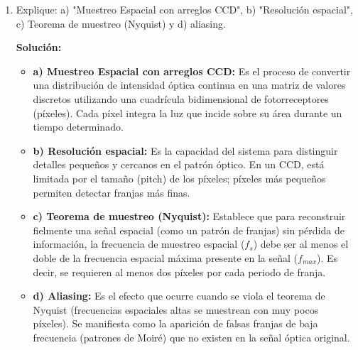 \documentclass[12pt, letterpaper]{article}
\begin{document}
\begin{enumerate}
		\textbf{Solución:}
		\begin{itemize}
			\item Sabiendo que la ecuación de interferencia es $I = I_1 + I_2 + 2\sqrt{I_1 I_2}\cos(\Delta\phi)$, los valores máximos y mínimos ocurren cuando el coseno es $1$ y $-1$, respectivamente:
			$$ I_{max} = I_1 + I_2 + 2\sqrt{I_1 I_2} $$
			$$ I_{min} = I_1 + I_2 - 2\sqrt{I_1 I_2} $$
			Sustituyendo en $\gamma$:
			$$ \gamma = \frac{(I_1 + I_2 + 2\sqrt{I_1 I_2}) - (I_1 + I_2 - 2\sqrt{I_1 I_2})}{(I_1 + I_2 + 2\sqrt{I_1 I_2}) + (I_1 + I_2 - 2\sqrt{I_1 I_2})} $$
			$$ \gamma = \frac{4\sqrt{I_1 I_2}}{2(I_1 + I_2)} = \frac{2\sqrt{I_1 I_2}}{I_1 + I_2} $$
			
			\item Cuando las intensidades son iguales ($I_1 = I_2 = I_0$):
			$$ \gamma = \frac{2\sqrt{I_0 I_0}}{I_0 + I_0} = \frac{2I_0}{2I_0} = 1 $$
			
			\item La visibilidad (o contraste) es una medida cuantitativa de la claridad de las franjas de interferencia. Su utilidad radica en que permite evaluar el grado de coherencia de la fuente de luz, el balance de intensidades en los brazos del interferómetro y la influencia de vibraciones o ruido en el sistema óptico.
		\end{itemize}
		
		\item Explique: a) "Muestreo Espacial con arreglos CCD", b) "Resolución espacial", c) Teorema de muestreo (Nyquist) y d) aliasing. 
		
		\textbf{Solución:}
		\begin{itemize}
			\item \textbf{a) Muestreo Espacial con arreglos CCD:} Es el proceso de convertir una distribución de intensidad óptica continua en una matriz de valores discretos utilizando una cuadrícula bidimensional de fotorreceptores (píxeles). Cada píxel integra la luz que incide sobre su área durante un tiempo determinado.
			\item \textbf{b) Resolución espacial:} Es la capacidad del sistema para distinguir detalles pequeños y cercanos en el patrón óptico. En un CCD, está limitada por el tamaño (pitch) de los píxeles; píxeles más pequeños permiten detectar franjas más finas.
			\item \textbf{c) Teorema de muestreo (Nyquist):} Establece que para reconstruir fielmente una señal espacial (como un patrón de franjas) sin pérdida de información, la frecuencia de muestreo espacial ($f_s$) debe ser al menos el doble de la frecuencia espacial máxima presente en la señal ($f_{max}$). Es decir, se requieren al menos dos píxeles por cada periodo de franja.
			\item \textbf{d) Aliasing:} Es el efecto que ocurre cuando se viola el teorema de Nyquist (frecuencias espaciales altas se muestrean con muy pocos píxeles). Se manifiesta como la aparición de falsas franjas de baja frecuencia (patrones de Moiré) que no existen en la señal óptica original.
		\end{itemize}
		

\end{enumerate}
\end{document}
